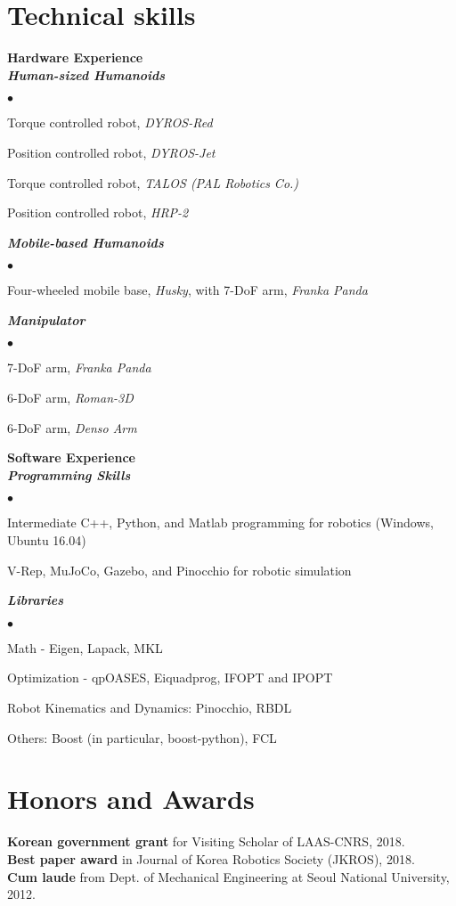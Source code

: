 \documentclass[margin,line]{res}
\newenvironment{list2}{
  \begin{list}{$\bullet$}{%
      \setlength{\itemsep}{0in}
      \setlength{\parsep}{0in} \setlength{\parskip}{0in}
      \setlength{\topsep}{0in} \setlength{\partopsep}{0in} 
      \setlength{\leftmargin}{0.2in}}}{\end{list}}
\begin{document}
\begin{resume}
\section{\sc Technical skills}
{\bf Hardware  Experience} \\
\textbf{\emph { Human-sized Humanoids}}
\begin{list2}
\item Torque controlled robot, \textit{DYROS-Red}
\item Position controlled robot, \textit{DYROS-Jet}
\item Torque controlled robot, \textit{TALOS (PAL Robotics Co.)}
\item Position controlled robot, \textit{HRP-2}
\end{list2}
\vspace{-0.3cm}
\textbf{\emph { Mobile-based Humanoids}}
\begin{list2}
\item Four-wheeled mobile base, \textit{Husky}, with 7-DoF arm, \textit{Franka Panda}
\end{list2}
\vspace{-0.3cm}
\textbf{\emph { Manipulator}}
\begin{list2}
\item 7-DoF arm, \textit{Franka Panda}
\item 6-DoF arm, \textit{Roman-3D}
\item 6-DoF arm, \textit{Denso Arm}
\end{list2}
{\bf Software Experience} \\
\textbf{\emph { Programming Skills}}
\begin{list2}
\item Intermediate C++, Python, and Matlab programming for robotics (Windows, Ubuntu 16.04)
\item V-Rep, MuJoCo, Gazebo, and Pinocchio for robotic simulation
\end{list2}
\vspace{-0.3cm}
\textbf{\emph { Libraries}}
\begin{list2}
\item Math - Eigen, Lapack, MKL
\item Optimization - qpOASES, Eiquadprog, IFOPT and IPOPT
\item Robot Kinematics and Dynamics: Pinocchio, RBDL
\item Others: Boost (in particular, boost-python), FCL
\end{list2}

\section{\sc Honors and Awards} 
\textbf{Korean government grant} for Visiting Scholar of LAAS-CNRS, 2018. \\
\textbf{Best paper award} in Journal of Korea Robotics Society (JKROS), 2018.\\
\textbf{Cum laude} from Dept. of Mechanical Engineering at Seoul National University, 2012. 



\end{resume}
\end{document}
